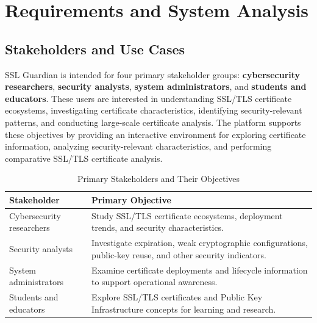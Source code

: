 
\chapter{Requirements and System Analysis}
\label{chap:requirements-system-analysis}

\section{Stakeholders and Use Cases}
\label{sec:stakeholders-use-cases}

SSL Guardian is intended for four primary stakeholder groups:
\textbf{cybersecurity researchers}, \textbf{security analysts},
\textbf{system administrators}, and \textbf{students and educators}. These
users are interested in understanding SSL/TLS certificate ecosystems,
investigating certificate characteristics, identifying security-relevant
patterns, and conducting large-scale certificate analysis. The platform supports 
these objectives by providing an interactive environment for exploring 
certificate information, analyzing security-relevant characteristics, and
performing comparative SSL/TLS certificate analysis.

\begin{table}[H]
  \centering
  \small
  \setlength{\tabcolsep}{4pt}
  \renewcommand{\arraystretch}{1.08}
  \caption{Primary Stakeholders and Their Objectives}
  \label{tab:primary-stakeholders}
  \begin{tabularx}{\textwidth}{@{}>{\RaggedRight\arraybackslash}p{}Y@{}}
    \toprule
    \textbf{Stakeholder} & \textbf{Primary Objective} \\
    \midrule
    Cybersecurity researchers & Study SSL/TLS certificate ecosystems, deployment trends, and security characteristics. \\
    Security analysts & Investigate expiration, weak cryptographic configurations, public-key reuse, and other security indicators. \\
    System administrators & Examine certificate deployments and lifecycle information to support operational awareness. \\
    Students and educators & Explore SSL/TLS certificates and Public Key Infrastructure concepts for learning and research. \\
    \bottomrule
  \end{tabularx}
\end{table}

